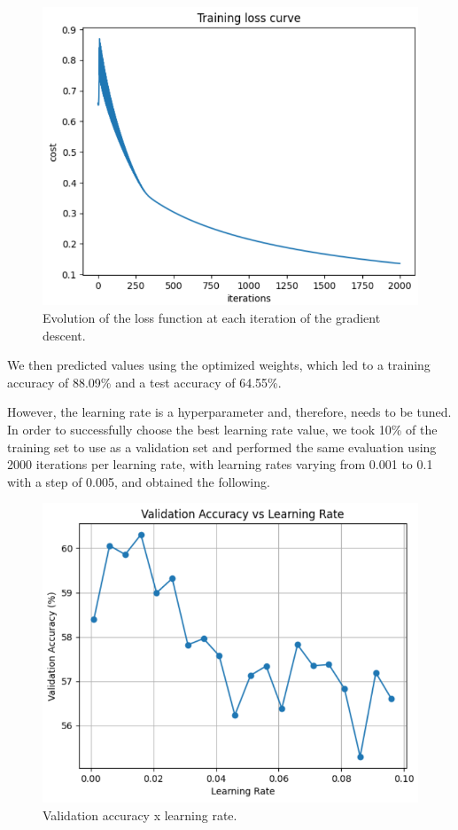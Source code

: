 \documentclass{thesisreport}
\begin{document}
\begin{figure}[H]
    \centering
    \includegraphics[width=1\linewidth]{figures/Training loss.png}
    \caption{Evolution of the loss function at each iteration of the gradient descent.}
    \label{fig:training_loss}
\end{figure}

We then predicted values using the optimized weights, which led to a training accuracy of 88.09\% and a test accuracy of 64.55\%.

However, the learning rate is a hyperparameter and, therefore, needs to be tuned. In order to successfully choose the best learning rate value, we took 10\% of the training set to use as a validation set and performed the same evaluation using 2000 iterations per learning rate, with learning rates varying from 0.001 to 0.1 with a step of 0.005, and obtained the following.

\begin{figure}[H]
    \centering
    \includegraphics[width=1\linewidth]{figures/lrbest.png}
    \caption{Validation accuracy x learning rate.}
    \label{fig:lr_accuracy}
\end{figure}
\end{document}
